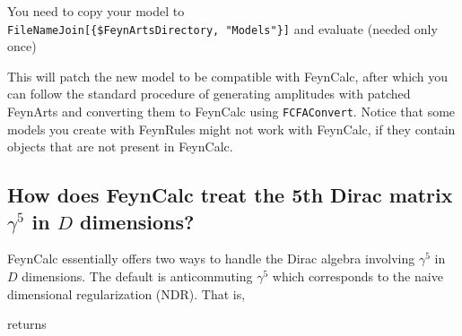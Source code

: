 \documentclass[../FeynCalcManual.tex]{subfiles}
\begin{document}
You need to copy your model to
\texttt{FileNameJoin[\allowbreak{}\{\allowbreak{}\$FeynArtsDirectory,\ \allowbreak{}"Models"\}]}
and evaluate (needed only once)

\begin{Shaded}
\begin{Highlighting}[]
\OperatorTok{[}\OtherTok{{-}\textgreater{}} \OperatorTok{]}\NormalTok{;}
\end{Highlighting}
\end{Shaded}

This will patch the new model to be compatible with FeynCalc, after
which you can follow the standard procedure of generating amplitudes
with patched FeynArts and converting them to FeynCalc using
\texttt{FCFAConvert}. Notice that some models you create with FeynRules
might not work with FeynCalc, if they contain objects that are not
present in FeynCalc.

\hypertarget{how-does-feyncalc-treat-the-5th-dirac-matrix-gamma5-in-d-dimensions}{%
\subsection{\texorpdfstring{How does FeynCalc treat the 5th Dirac matrix
\(\gamma^5\) in \(D\)
dimensions?}{How does FeynCalc treat the 5th Dirac matrix \textbackslash gamma\^{}5 in D dimensions?}}\label{how-does-feyncalc-treat-the-5th-dirac-matrix-gamma5-in-d-dimensions}}

FeynCalc essentially offers two ways to handle the Dirac algebra
involving \(\gamma^5\) in \(D\) dimensions. The default is anticommuting
\(\gamma^5\) which corresponds to the naive dimensional regularization
(NDR). That is,

\begin{Shaded}
\begin{Highlighting}[]
\OperatorTok{[}\OperatorTok{[}\OperatorTok{]}\OperatorTok{[}\OperatorTok{]]}
\end{Highlighting}
\end{Shaded}

returns

\begin{Shaded}
\begin{Highlighting}[]
\SpecialCharTok{{-}}\OperatorTok{[}\OperatorTok{]}\OperatorTok{[}\OperatorTok{]}
\end{Highlighting}
\end{Shaded}
\end{document}
